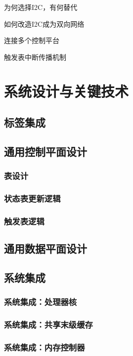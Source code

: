 为何选择I2C，有何替代

如何改造I2C成为双向网络

连接多个控制平台

触发表中断传播机制


\section{系统设计与关键技术}

\subsection{标签集成}

\subsection{通用控制平面设计}

\subsubsection*{表设计}
\subsubsection*{状态表更新逻辑}
\subsubsection*{触发表逻辑}

\subsection{通用数据平面设计}

\subsection{系统集成}

\subsubsection*{系统集成：处理器核}

\subsubsection*{系统集成：共享末级缓存}

\subsubsection*{系统集成：内存控制器}

